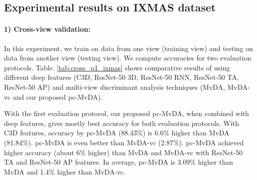 
\subsection{Experimental results on IXMAS dataset}
    \paragraph{1) Cross-view validation:} In this experiment, we train on data from one view (training view) and testing on data from another view (testing view). We compute accuracies for two evaluation protocols. Table. \ref{tab:cross_p1_ixmas} shows comparative results of using different deep features (C3D, ResNet-50 3D, ResNet-50 RNN, ResNet-50 TA, ResNet-50 AP) and multi-view discriminant analysis techniques (MvDA, MvDA-vc and our proposed pc-MvDA). 

    With the first evaluation protocol, our proposed pc-MvDA, when combined with deep features, gives mostly best accuracy for both evaluation protocols. With C3D features, accuracy by pc-MvDA (88.43\%) is 6.6\% higher than MvDA (81.84\%). pc-MvDA is even better than MvDA-vc (2.87\%). pc-MvDA achieved higher accuracy (about 6\% higher) than MvDA and MvDA-vc with ResNet-50 TA and ResNet-50 AP features. In average, pc-MvDA is 3.09\% higher than MvDA and 1.4\% higher than MvDA-vc.
    
    \begin{table}[htbp]
    \centering
    \caption{Cross-view recognition comparison on IXMAS dataset}
    \label{tab:cross_p1_ixmas}
    \end{table}

